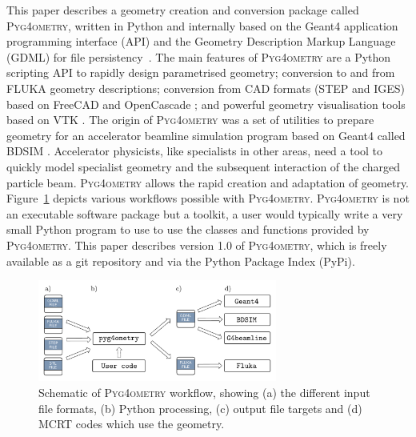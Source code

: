 \documentclass[final,5p,times,twocolumn]{elsarticle}
\newcommand{\PYGEOMETRY}{\textsc{Pyg4ometry}}
\begin{document}
This paper describes a geometry creation and conversion package called \PYGEOMETRY{}, written in Python and internally based on the Geant4 application 
programming interface (API) and the Geometry Description Markup Language (GDML) for file persistency~\cite{GDML}. The main features of \PYGEOMETRY{} 
are a Python scripting API to rapidly design parametrised geometry; conversion to and from  FLUKA geometry descriptions; conversion from CAD formats  (STEP 
and IGES) based on FreeCAD \cite{FreeCAD} and OpenCascade \cite{OpenCASCADE}; and powerful geometry visualisation tools based on VTK \cite{VTK4}. The 
origin of \PYGEOMETRY{} was a set of utilities to prepare geometry for an accelerator beamline simulation program based on Geant4 called BDSIM \cite{BDSIM_Nevay}. 
Accelerator physicists, like specialists in other areas, need a tool to quickly model specialist geometry and the subsequent interaction of the charged particle beam. 
\PYGEOMETRY{} allows the rapid creation and adaptation of geometry. Figure~\ref{fig:workflow} depicts various workflows possible with \PYGEOMETRY{}. \PYGEOMETRY{} 
is not an executable software package but a toolkit, a user would typically write a very small Python program to use to use the classes and functions provided by 
\PYGEOMETRY{}. This paper describes version 1.0 of \PYGEOMETRY{}, which is freely available as a git repository and via the Python Package Index (PyPi).

\begin{figure}[hbt!]
  \normalsize
  \centering
  \includegraphics[width=0.7\textwidth]{./diagrams/workflow.pdf}
  \caption{\label{fig:workflow}Schematic of \PYGEOMETRY{} workflow, showing (a) the different input file formats, (b) Python processing, (c) output file targets and 
  (d) MCRT codes which use the geometry. }
\end{figure}
\end{document}
